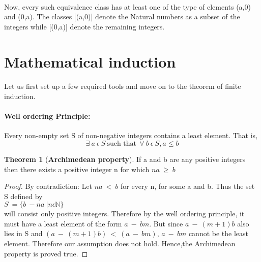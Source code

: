 \documentclass[15,a4paper]{report}
\theoremstyle{definition}
\newtheorem{theorem}{Theorem}[section]
\theoremstyle{remark}
\begin{document}
\paragraph{} Now, every such equivalence class has at least one of the type of elements (a,0) and (0,a). The classes [(a,0)] denote the Natural numbers as a subset of the integers while [(0,a)] denote the remaining integers.




\section{Mathematical induction}
\paragraph{} Let us first set up a few required tools and move on to the theorem of finite induction.

\paragraph{Well ordering Principle:} Every non-empty set S of non-negative integers contains a least element. That is,\[ \exists~ a ~ \epsilon~ S~ \textrm{such that}~~ \forall ~b~ \epsilon~ S ,  a \leq b
\] 

\begin{theorem}[\textbf{Archimedean property}]
    If a and b are any positive integers then there exists a positive integer n for which $ na ~ \ge ~ b $
\end{theorem}
\begin{proof}
    By contradiction: Let $na ~ < ~b $ for every n, for some a and b. Thus the set S defined by \\
    $ S ~ = \{b ~- na ~ | n \epsilon \mathbb{N}\}$\\
    will consist only positive integers. Therefore by the well ordering principle, it must have a least element of the form $a~-~bm$. But since $a~-~(m+1)b$  also lies in S and $(a~-~(m+1)b)~ < ~( a~-~bm)$, $ a~-~bm$ cannot be the least element. Therefore our assumption does not hold. Hence,the Archimedean property is proved true.
\end{proof}
\end{document}
